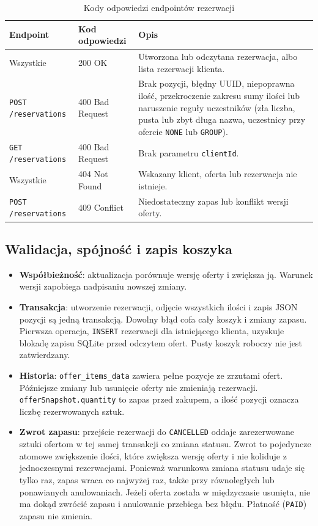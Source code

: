 \begin{table}[H]
  \centering
  \renewcommand{\arraystretch}{1.3}
  \begin{tabularx}{\textwidth}{|l|l|X|}
    \hline
    \textbf{Endpoint} & \textbf{Kod odpowiedzi} & \textbf{Opis} \\
    \hline
    Wszystkie & 200 OK & Utworzona lub odczytana rezerwacja, albo lista rezerwacji klienta. \\
    \hline
    \texttt{POST /reservations} & 400 Bad Request & Brak pozycji, błędny UUID, niepoprawna ilość, przekroczenie zakresu sumy ilości lub naruszenie reguły uczestników (zła liczba, pusta lub zbyt długa nazwa, uczestnicy przy ofercie \texttt{NONE} lub \texttt{GROUP}).\\
    \hline
    \texttt{GET /reservations} & 400 Bad Request & Brak parametru \texttt{clientId}. \\
    \hline
    Wszystkie & 404 Not Found & Wskazany klient, oferta lub rezerwacja nie istnieje. \\
    \hline
    \texttt{POST /reservations} & 409 Conflict & Niedostateczny zapas lub konflikt wersji oferty. \\
    \hline
  \end{tabularx}
  \caption{Kody odpowiedzi endpointów rezerwacji}
  \label{tab:reservation-response-codes}
\end{table}

\subsection{Walidacja, spójność i zapis koszyka}

\begin{itemize}
  \item \textbf{Współbieżność}: aktualizacja porównuje wersję oferty i zwiększa ją.
    Warunek wersji zapobiega nadpisaniu nowszej zmiany.
  \item \textbf{Transakcja}: utworzenie rezerwacji, odjęcie wszystkich ilości i zapis
    JSON pozycji są jedną transakcją. Dowolny błąd cofa cały koszyk i zmiany zapasu.
    Pierwsza operacja, \texttt{INSERT} rezerwacji dla istniejącego klienta,
    uzyskuje blokadę zapisu SQLite przed odczytem ofert. Pusty koszyk roboczy nie jest zatwierdzany.
  \item \textbf{Historia}: \texttt{offer\_items\_data} zawiera pełne pozycje ze
    zrzutami ofert. Późniejsze zmiany lub usunięcie oferty nie zmieniają rezerwacji.
    \texttt{offerSnapshot.quantity} to zapas przed zakupem, a ilość pozycji
    oznacza liczbę rezerwowanych sztuk.
  \item \textbf{Zwrot zapasu}: przejście rezerwacji do \texttt{CANCELLED} oddaje zarezerwowane sztuki ofertom w tej samej transakcji co zmiana statusu.
    Zwrot to pojedyncze atomowe zwiększenie ilości, które zwiększa wersję oferty i nie koliduje z jednoczesnymi rezerwacjami.
    Ponieważ warunkowa zmiana statusu udaje się tylko raz, zapas wraca co najwyżej raz, także przy równoległych lub ponawianych anulowaniach.
    Jeżeli oferta została w międzyczasie usunięta, nie ma dokąd zwrócić zapasu i anulowanie przebiega bez błędu.
    Płatność (\texttt{PAID}) zapasu nie zmienia.
\end{itemize}

